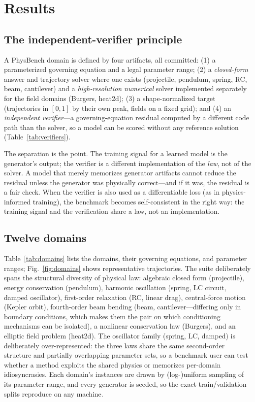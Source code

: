 \documentclass[11pt,a4paper]{article}
\begin{document}
\section{Results}
\label{sec:results}

\subsection{The independent-verifier principle}
\label{sec:principle}

A PhysBench domain is defined by four artifacts, all committed:
(1) a parameterized governing equation and a legal parameter range;
(2) a \emph{closed-form} answer and trajectory solver where one exists
(projectile, pendulum, spring, RC, beam, cantilever) and a
\emph{high-resolution numerical} solver implemented separately for the field
domains (Burgers, heat2d); (3) a shape-normalized target (trajectories in
$[0,1]$ by their own peak, fields on a fixed grid); and (4) an
\emph{independent verifier}---a governing-equation residual computed by a
different code path than the solver, so a model can be scored without any
reference solution (Table~\ref{tab:verifiers}).

The separation is the point. The training signal for a learned model is the
generator's output; the verifier is a different implementation of the
\emph{law}, not of the solver. A model that merely memorizes generator
artifacts cannot reduce the residual unless the generator was physically
correct---and if it was, the residual is a fair check. When the verifier is
also used as a differentiable loss (as in physics-informed training), the
benchmark becomes self-consistent in the right way: the training signal and
the verification share a law, not an implementation.

\subsection{Twelve domains}
\label{sec:domains}

Table~\ref{tab:domains} lists the domains, their governing equations, and
parameter ranges; Fig.~\ref{fig:domains} shows representative trajectories.
The suite deliberately spans the structural diversity of physical law:
algebraic closed form (projectile), energy conservation (pendulum), harmonic
oscillation (spring, LC circuit, damped oscillator), first-order relaxation
(RC, linear drag), central-force motion (Kepler orbit), fourth-order beam
bending (beam, cantilever---differing only in boundary conditions, which
makes them the pair on which conditioning mechanisms can be isolated), a
nonlinear conservation law (Burgers), and an elliptic field problem
(heat2d). The oscillator family (spring, LC, damped) is deliberately
over-represented: the three laws share the same second-order structure and
partially overlapping parameter sets, so a benchmark user can test whether a
method exploits the shared physics or memorizes per-domain idiosyncrasies.
Each domain's instances are drawn by (log-)uniform sampling of its parameter
range, and every generator is seeded, so the exact train/validation splits
reproduce on any machine.
\end{document}
